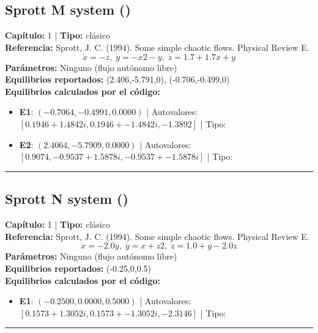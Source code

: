 \subsection*{Sprott M system ()}
\textbf{Capítulo:} 1 | \textbf{Tipo:} clásico\\
\textbf{Referencia:} Sprott, J. C. (1994). Some simple chaotic flows. Physical Review E.\\
\[\dot{x}=-z, \; \dot{y}=-x2-y, \; \dot{z}=1.7+1.7x+y\]
\textbf{Parámetros:} Ninguno (flujo autónomo libre)\\
\textbf{Equilibrios reportados:} (2.406,-5.791,0), (-0.706,-0.499,0)\\
\textbf{Equilibrios calculados por el código:}
\begin{itemize}
  \item \textbf{E1}: $(-0.7064, -0.4991, 0.0000)$ | Autovalores: $[0.1946 + 1.4842i, 0.1946 + -1.4842i, -1.3892]$ | Tipo: 
  \item \textbf{E2}: $(2.4064, -5.7909, 0.0000)$ | Autovalores: $[0.9074, -0.9537 + 1.5878i, -0.9537 + -1.5878i]$ | Tipo: 
\end{itemize}
\hrule

\subsection*{Sprott N system ()}
\textbf{Capítulo:} 1 | \textbf{Tipo:} clásico\\
\textbf{Referencia:} Sprott, J. C. (1994). Some simple chaotic flows. Physical Review E.\\
\[\dot{x}=-2.0y, \; \dot{y}=x+z2, \; \dot{z}=1.0+y-2.0z\]
\textbf{Parámetros:} Ninguno (flujo autónomo libre)\\
\textbf{Equilibrios reportados:} (-0.25,0,0.5)\\
\textbf{Equilibrios calculados por el código:}
\begin{itemize}
  \item \textbf{E1}: $(-0.2500, 0.0000, 0.5000)$ | Autovalores: $[0.1573 + 1.3052i, 0.1573 + -1.3052i, -2.3146]$ | Tipo: 
\end{itemize}
\hrule

